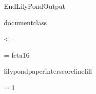 %
%
%
\edef\lilyponddefsELC{\the\endlinechar}%
\relax

\def\ifundefined#1{
  \expandafter\ifx\csname#1\endcsname\relax
}


\ifx\mustmakelilypondtitle\undefined
\else
  \makelilypondtitle
\fi

\ifx\mustmakelilypondpiecetitle\undefined
\else
  \makelilypondpiecetitle
\fi


\def\SkipLilydefs{
  \endlinechar \lilyponddefsELC
  \endinput}
\ifundefined{EndLilyPondOutput}
  \def\EndLilyPondOutput{\csname bye\endcsname}
  \def\SkipLilydefs{}
\fi
\SkipLilydefs


\ifundefined{documentclass}
  

  <\lilypondpaperlinewidth
  \hsize=\lilypondpaperlinewidth\lilypondpaperunit
  \fi
\else
  
\fi



\font\fetasixteen = feta16
\def\fetafont{\fetasixteen}
\def\fetachar#1{\hbox{\fetasixteen#1}}

\def\botalign#1{
  \vbox to 0pt{\vss #1}
}
\def\leftalign#1{
  \hbox to 0pt{#1\hss}
}


%
%

\def\myfilbreak{}%


\ifundefined{lilypondpaperinterscorelinefill}
  \def\lilypondpaperinterscorelinefill{0}
\else
  \def\lilypondpaperinterscorelinefill{1}
\fi

\def\interscoreline{
  \vskip \lilypondpaperinterscoreline \lilypondpaperunit
    plus \lilypondpaperinterscorelinefill fill
}

\def\placebox#1#2#3{
  \botalign{
    \hbox{\raise #1\leftalign{\kern #2{}#3}}
  }
}

\ifx\pdfoutput\undefined  
  
\else
  \ifx\pdfoutput\relax
    
  \else
    \pdfoutput = 1
    
  \fi
\fi

